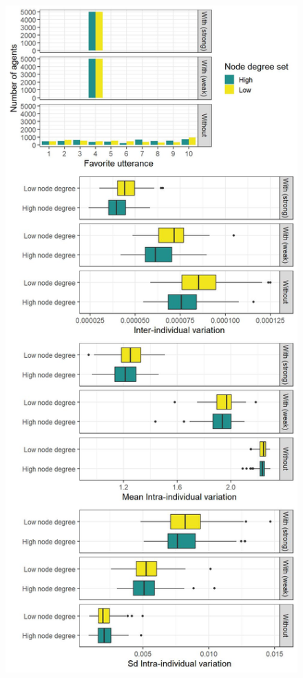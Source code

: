 \documentclass[
]{article}
\begin{document}
\begin{figure}[!H]

{\centering \includegraphics{./Figures/unnamed-chunk-28-1} 

}


\end{figure}
\end{document}
